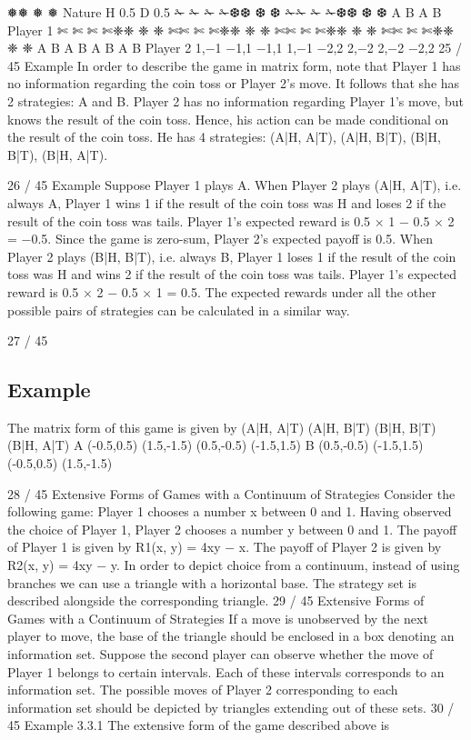 \documentclass[]{report}
\begin{document}
❅❅
❅
❅
Nature
H 0.5 D 0.5
✁
✁
✁
✁❆❆
❆
❆ ✁✁
✁
✁❆❆
❆
❆
A B A B
Player 1
✄
✄
✄
✄❈❈
❈
❈ ✄✄
✄
✄❈❈
❈
❈ ✄✄
✄
✄❈❈
❈
❈ ✄✄
✄
✄❈❈
❈
❈
A B A B A B A B
Player 2
1,−1 −1,1 −1,1 1,−1 −2,2 2,−2 2,−2 −2,2
25 / 45
Example
In order to describe the game in matrix form, note that Player 1
has no information regarding the coin toss or Player 2’s move. It
follows that she has 2 strategies: A and B.
Player 2 has no information regarding Player 1’s move, but knows
the result of the coin toss. Hence, his action can be made
conditional on the result of the coin toss. He has 4 strategies:
(A|H, A|T), (A|H, B|T), (B|H, B|T), (B|H, A|T).

26 / 45
Example
Suppose Player 1 plays A.
When Player 2 plays (A|H, A|T), i.e. always A, Player 1 wins 1 if
the result of the coin toss was H and loses 2 if the result of the
coin toss was tails. Player 1’s expected reward is
0.5 × 1 − 0.5 × 2 = −0.5. Since the game is zero-sum, Player 2’s
expected payoff is 0.5.
When Player 2 plays (B|H, B|T), i.e. always B, Player 1 loses 1 if
the result of the coin toss was H and wins 2 if the result of the
coin toss was tails. Player 1’s expected reward is
0.5 × 2 − 0.5 × 1 = 0.5.
The expected rewards under all the other possible pairs of
strategies can be calculated in a similar way.

27 / 45
\subsection{Example}
The matrix form of this game is given by
(A|H, A|T) (A|H, B|T) (B|H, B|T) (B|H, A|T)
A (-0.5,0.5) (1.5,-1.5) (0.5,-0.5) (-1.5,1.5)
B (0.5,-0.5) (-1.5,1.5) (-0.5,0.5) (1.5,-1.5)

28 / 45
Extensive Forms of Games with a Continuum of Strategies
Consider the following game:
Player 1 chooses a number x between 0 and 1. Having observed
the choice of Player 1, Player 2 chooses a number y between 0 and
1.
The payoff of Player 1 is given by R1(x, y) = 4xy − x. The payoff
of Player 2 is given by R2(x, y) = 4xy − y.
In order to depict choice from a continuum, instead of using
branches we can use a triangle with a horizontal base. The
strategy set is described alongside the corresponding triangle.
29 / 45
Extensive Forms of Games with a Continuum of Strategies
If a move is unobserved by the next player to move, the base of the
triangle should be enclosed in a box denoting an information set.
Suppose the second player can observe whether the move of Player
1 belongs to certain intervals. Each of these intervals corresponds
to an information set.
The possible moves of Player 2 corresponding to each information
set should be depicted by triangles extending out of these sets.
30 / 45
Example 3.3.1
The extensive form of the game described above is
\end{document}
